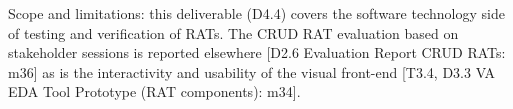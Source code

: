 
Scope and limitations: this deliverable (D4.4) covers the software
technology side of testing and verification of RATs.
%
The CRUD RAT evaluation based on stakeholder sessions is reported
elsewhere [D2.6 Evaluation Report CRUD RATs: m36] as is the
interactivity and usability of the visual front-end [T3.4, D3.3 VA EDA
  Tool Prototype (RAT components): m34].
